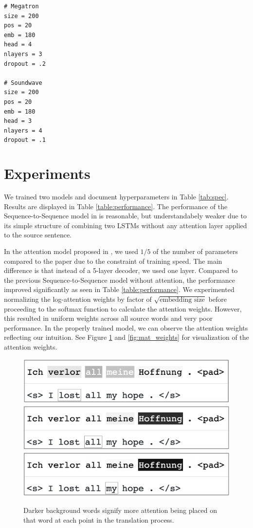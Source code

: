 \documentclass[12pt]{article}
\begin{document}
\begin{verbatim}
# Megatron
size = 200
pos = 20
emb = 180
head = 4
nlayers = 3
dropout = .2

# Soundwave
size = 200
pos = 20
emb = 180
head = 3
nlayers = 4
dropout = .1
\end{verbatim}

\section{Experiments}
We trained two models and document hyperparameters in Table \ref{tab:spec}. Results are displayed in Table \ref{table:performance}. The performance of the Sequence-to-Sequence model in \cite{sutskever2014sequence} is reasonable, but understandabely weaker due to its simple structure of combining two LSTMs without any attention layer applied to the source sentence.

In the attention model proposed in \cite{vaswani2017attention}, we used $1/5$ of the number of parameters compared to the paper due to the constraint of training speed. The main difference is that instead of a 5-layer decoder, we used one layer. Compared to the previous Sequence-to-Sequence model without attention, the performance improved significantly as seen in Table \ref{table:performance}. We experimented normalizing the log-attention weights by factor of $\sqrt{\textrm{embedding size}}$ before proceeding to the softmax function to calculate the attention weights. However, this resulted in uniform weights across all source words and very poor performance. In the properly trained model, we can observe the attention weights reflecting our intuition. See Figure \ref{fig:word_weights} and \ref{fig:mat_weights} for visualization of the attention weights. 

\begin{figure}
	\centering
	\includegraphics[width=.7\linewidth]{figs/attn1.png}
	\includegraphics[width=.7\linewidth]{figs/attn2.png}
	\includegraphics[width=.7\linewidth]{figs/attn3.png}
	\caption{Darker background words signify more attention being placed on that word at each point in the translation process.}
	\label{fig:word_weights}
\end{figure}
\end{document}
